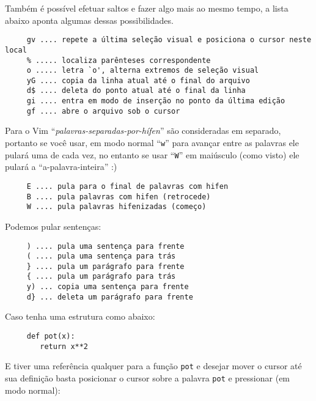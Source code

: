 Também é possível efetuar saltos e fazer algo mais ao mesmo tempo, a lista abaixo aponta 
algumas dessas possibilidades. %
\begin{verbatim}     
     gv .... repete a última seleção visual e posiciona o cursor neste local
     % ..... localiza parênteses correspondente
     o ..... letra `o', alterna extremos de seleção visual
     yG .... copia da linha atual até o final do arquivo
     d$ .... deleta do ponto atual até o final da linha
     gi .... entra em modo de inserção no ponto da última edição
     gf .... abre o arquivo sob o cursor
\end{verbatim}

Para o Vim ``{\em{palavras-separadas-por-hífen}}'' são consideradas em separado, portanto se você usar,
em modo normal ``\verb+w+'' para avançar entre as palavras ele pulará uma de
cada vez, no entanto se usar ``\verb+W+''
em maiúsculo (como visto) ele pulará a ``a-palavra-inteira'' :)

\begin{verbatim}
     E .... pula para o final de palavras com hifen
     B .... pula palavras com hifen (retrocede)
     W .... pula palavras hifenizadas (começo)
\end{verbatim}

Podemos pular sentenças:
\begin{verbatim}
     ) .... pula uma sentença para frente
     ( .... pula uma sentença para trás
     } .... pula um parágrafo para frente
     { .... pula um parágrafo para trás
     y) ... copia uma sentença para frente
     d} ... deleta um parágrafo para frente
\end{verbatim}

Caso tenha uma estrutura como abaixo:

\begin{verbatim}
     def pot(x):
        return x**2
\end{verbatim}

E tiver uma referência qualquer para a função \verb+pot+ e desejar
mover o cursor até sua definição basta posicionar o cursor sobre a palavra
\verb+pot+ e pressionar (em modo normal):

